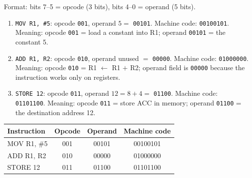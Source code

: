 \documentclass[11pt]{article}
\begin{document}
\begin{corrige}
Format: bits 7--5 = opcode (3 bits), bits 4--0 = operand (5 bits).

\begin{enumerate}
\item \texttt{MOV R1, \#5}: opcode \texttt{001}, operand $5 =$ \texttt{00101}.
Machine code: \texttt{00100101}. Meaning: opcode \texttt{001} = load a constant into R1; operand \texttt{00101} = the constant 5.
\item \texttt{ADD R1, R2}: opcode \texttt{010}, operand unused $=$ \texttt{00000}.
Machine code: \texttt{01000000}. Meaning: opcode \texttt{010} = R1 $\leftarrow$ R1 $+$ R2; operand field is \texttt{00000} because the instruction works only on registers.
\item \texttt{STORE 12}: opcode \texttt{011}, operand $12 = 8+4 =$ \texttt{01100}.
Machine code: \texttt{01101100}. Meaning: opcode \texttt{011} = store ACC in memory; operand \texttt{01100} = the destination address 12.
\end{enumerate}

\begin{center}
\begin{tabular}{|l|c|c|c|}
\hline
\rowcolor{popblueL} \textbf{Instruction} & \textbf{Opcode} & \textbf{Operand} & \textbf{Machine code} \\
\hline
MOV R1, \#5 & 001 & 00101 & 00100101 \\
ADD R1, R2 & 010 & 00000 & 01000000 \\
STORE 12 & 011 & 01100 & 01101100 \\
\hline
\end{tabular}
\end{center}
\end{corrige}
\end{document}
